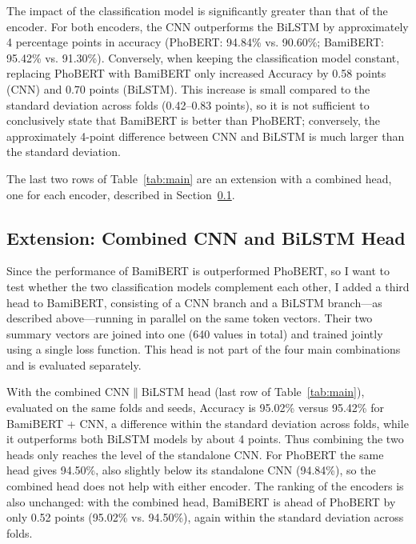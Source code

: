 \documentclass[conference,a4paper]{IEEEtran}
\begin{document}
The impact of the classification model is significantly greater than that of the encoder. For both encoders, the CNN outperforms the BiLSTM by approximately 4 percentage points in accuracy (PhoBERT: 94.84\% vs. 90.60\%; BamiBERT: 95.42\% vs. 91.30\%). Conversely, when keeping the classification model constant, replacing PhoBERT with BamiBERT only increased Accuracy by 0.58 points (CNN) and 0.70 points (BiLSTM). This increase is small compared to the standard deviation across folds (0.42--0.83 points), so it is not sufficient to conclusively state that BamiBERT is better than PhoBERT; conversely, the approximately 4-point difference between CNN and BiLSTM is much larger than the standard deviation.

The last two rows of Table~\ref{tab:main} are an extension with a combined head, one for each encoder, described in Section~\ref{sec:ext}.

\subsection{Extension: Combined CNN and BiLSTM Head}
\label{sec:ext}
Since the performance of BamiBERT is outperformed PhoBERT, so I want to test whether the two classification models complement each other, I added a third head to BamiBERT, consisting of a CNN branch and a BiLSTM branch---as described above---running in parallel on the same token vectors. Their two summary vectors are joined into one (640 values in total) and trained jointly using a single loss function. This head is not part of the four main combinations and is evaluated separately.

With the combined CNN$\|$BiLSTM head (last row of Table~\ref{tab:main}), evaluated on the same folds and seeds, Accuracy is 95.02\% versus 95.42\% for BamiBERT + CNN, a difference within the standard deviation across folds, while it outperforms both BiLSTM models by about 4 points. Thus combining the two heads only reaches the level of the standalone CNN. For PhoBERT the same head gives 94.50\%, also slightly below its standalone CNN (94.84\%), so the combined head does not help with either encoder. The ranking of the encoders is also unchanged: with the combined head, BamiBERT is ahead of PhoBERT by only 0.52 points (95.02\% vs. 94.50\%), again within the standard deviation across folds.
\end{document}
